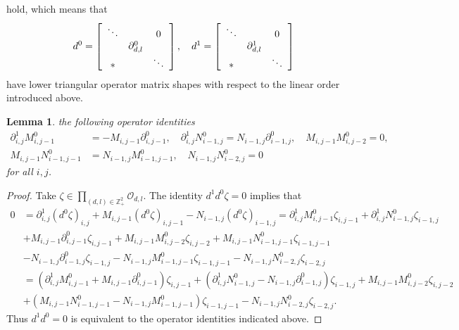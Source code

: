 \documentclass[12pt,reqno]{amsart}%
\theoremstyle{plain}
\newtheorem{lemma}{Lemma}
\numberwithin{theorem}{section} \numberwithin{equation}{section}
\numberwithin{lemma}{section}
\numberwithin{remark}{section}
\numberwithin{example}{section}
\numberwithin{proposition}{section}
\numberwithin{definition}{section}
\numberwithin{corollary}{section}
\begin{document}
hold, which means that%
\begin{equation}
d^{0}=\left[
\begin{array}
[c]{ccc}%
\ddots &  & 0\\
& \partial_{d,l}^{0} & \\
\ast &  & \ddots
\end{array}
\right]  ,\quad d^{1}=\left[
\begin{array}
[c]{ccc}%
\ddots &  & 0\\
& \partial_{d,l}^{1} & \\
\ast &  & \ddots
\end{array}
\right]  \label{d01}%
\end{equation}
have lower triangular operator matrix shapes with respect to the linear order
introduced above.

\begin{lemma}
\label{dmn}the following operator identities
\begin{align*}
\partial_{i,j}^{1}M_{i,j-1}^{0}  &  =-M_{i,j-1}\partial_{i,j-1}^{0}%
,\quad\partial_{i,j}^{1}N_{i-1,j}^{0}=N_{i-1,j}\partial_{i-1,j}^{0},\quad
M_{i,j-1}M_{i,j-2}^{0}=0,\\
M_{i,j-1}N_{i-1,j-1}^{0}  &  =N_{i-1,j}M_{i-1,j-1}^{0},\quad N_{i-1,j}%
N_{i-2,j}^{0}=0
\end{align*}
for all $i,j$.
\end{lemma}

\begin{proof}
Take $\zeta\in\prod\limits_{\left(  d,l\right)  \in\mathbb{Z}_{+}^{2}%
}\mathcal{O}_{d,l}$. The identity $d^{1}d^{0}\zeta=0$ implies that
\begin{align*}
0  &  =\partial_{i,j}^{1}\left(  d^{0}\zeta\right)  _{i,j}+M_{i,j-1}\left(
d^{0}\zeta\right)  _{i,j-1}-N_{i-1,j}\left(  d^{0}\zeta\right)  _{i-1,j}%
=\partial_{i,j}^{1}M_{i,j-1}^{0}\zeta_{i,j-1}+\partial_{i,j}^{1}N_{i-1,j}%
^{0}\zeta_{i-1,j}\\
&  +M_{i,j-1}\partial_{i,j-1}^{0}\zeta_{i,j-1}+M_{i,j-1}M_{i,j-2}^{0}%
\zeta_{i,j-2}+M_{i,j-1}N_{i-1,j-1}^{0}\zeta_{i-1,j-1}\\
&  -N_{i-1,j}\partial_{i-1,j}^{0}\zeta_{i-1,j}-N_{i-1,j}M_{i-1,j-1}^{0}%
\zeta_{i-1,j-1}-N_{i-1,j}N_{i-2,j}^{0}\zeta_{i-2,j}\\
&  =\left(  \partial_{i,j}^{1}M_{i,j-1}^{0}+M_{i,j-1}\partial_{i,j-1}%
^{0}\right)  \zeta_{i,j-1}+\left(  \partial_{i,j}^{1}N_{i-1,j}^{0}%
-N_{i-1,j}\partial_{i-1,j}^{0}\right)  \zeta_{i-1,j}+M_{i,j-1}M_{i,j-2}%
^{0}\zeta_{i,j-2}\\
&  +\left(  M_{i,j-1}N_{i-1,j-1}^{0}-N_{i-1,j}M_{i-1,j-1}^{0}\right)
\zeta_{i-1,j-1}-N_{i-1,j}N_{i-2,j}^{0}\zeta_{i-2,j}.
\end{align*}
Thus $d^{1}d^{0}=0$ is equivalent to the operator identities indicated above.
\end{proof}
\end{document}
